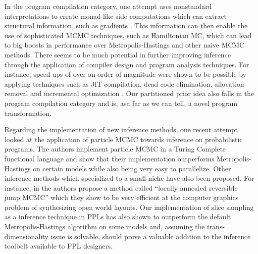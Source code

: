 In the program compilation category, one attempt uses nonstandard interpretations to create monad-like side computations which can extract structural information, such as gradients \cite{wingate2011nonstandard}. This information can then enable the use of sophisticated MCMC techniques, such as Hamiltonian MC, which can lead to big boosts in performance over Metropolis-Hastings and other naive MCMC methods. There seems to be much potential in further improving inference through the application of compiler design and program analysis techniques. For instance, speed-ups of over an order of magnitude were shown to be possible by applying techniques such as JIT compilation, dead code elimination, allocation removal and incremental optimization \cite{yang2013incrementalizing}. Our partitioned prior idea also falls in the program compilation category and is, asa far as we can tell, a novel program transformation.

Regarding the implementation of new inference methods, one recent attempt \cite{wood2014new} looked at the application of particle MCMC towards inference on probabilistic programs. The authors implement particle MCMC in a Turing Complete functional language and show that their implementation outperforms Metropolis-Hastings on certain models while also being very easy to parallelize. Other inference methods which specialized to a small niche have also been proposed. For instance, in \cite{yeh2012synthesizing} the authors propose a method called ``locally annealed reversible jump MCMC'' which they show to be very efficient at the computer graphics problem of synthesizing open world layouts. Our implementation of slice sampling as a inference technique in PPLs has also shown to outperform the default Metropolis-Hastings algorithm on some models and, assuming the trans-dimensionality issue is solvable, should prove a valuable addition to the inference toolbelt available to PPL designers.

